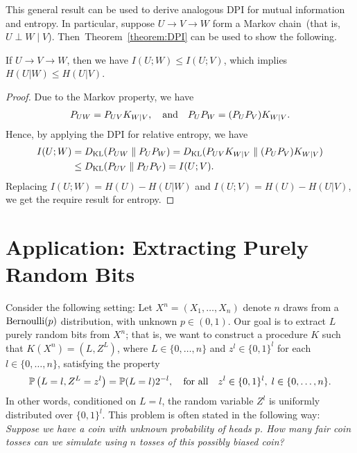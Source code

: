 \documentclass[12pt]{article}
\begin{document}
This general result can be used to derive analogous DPI for mutual information and entropy. In particular, suppose $U \longrightarrow V \longrightarrow W$ form a Markov chain~(that is, $U \perp W \mid V$). Then~Theorem~\ref{theorem:DPI} can be used to show the following. 
\begin{corollary}
\label{corollary:DPI} If $U \longrightarrow V \longrightarrow W$, then we have 
$I(U; W) \leq I(U; V)$,  which implies $H(U|W) \leq H(U|V)$. 
\end{corollary} 
\begin{proof}
Due to the Markov property, we have 
\begin{align}
P_{UW} = P_{UV} K_{W|V}, \quad \text{and} \quad P_U P_W = (P_U P_V) K_{W|V}. 
\end{align}
Hence, by applying the DPI for relative entropy, we have 
\begin{align}
I(U;W) &= D_{\text{KL}}(P_{UW} \parallel P_U P_W) = D_{\text{KL}}(P_{UV} K_{W|V} \parallel (P_U P_V) K_{W|V})  \\ 
&\leq D_{\text{KL}}(P_{UV} \parallel P_U P_V)= I(U; V). 
\end{align}
Replacing $I(U;W) = H(U) - H(U|W)$ and $I(U;V) = H(U) - H(U|V)$, we get the require result for entropy. 
\end{proof}
\section{Application: Extracting Purely Random Bits}

Consider the following setting: Let $X^n = (X_1, \ldots, X_n)$ denote $n$ \iid draws from a $\mathrm{Bernoulli}(p)$ distribution, with unknown $p \in (0, 1)$. Our goal is to extract $L$ purely random bits from $X^n$; that is, we want to construct a procedure 
$K$ such that $K(X^n) = (L, Z^L)$, where $L \in \{0, \ldots, n\}$ and $z^l \in \{0, 1\}^l$ for each $l \in \{0, \ldots, n\}$, satisfying the property 
\begin{align}
\mathbb{P}\left( L=l, Z^L = z^l \right) = \mathbb{P}(L=l) 2^{-l},  \quad \text{for all} \quad z^l \in \{0,1\}^l, \; l \in \{0, \ldots, n\}.  \label{eq:fair-coin-toss}
\end{align}
In other words, conditioned on $L=l$, the random variable $Z^l$ is uniformly distributed over $\{0,1\}^l$.  This problem is often stated in the following way: \emph{Suppose we have a coin with unknown probability of heads $p$. How many fair coin tosses can we simulate using $n$ tosses of this possibly biased coin?}
\end{document}
